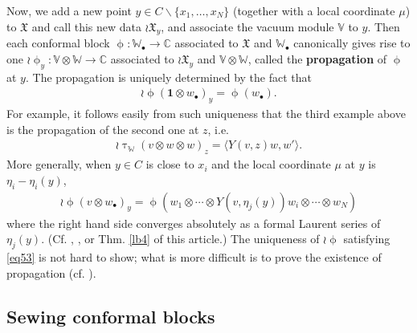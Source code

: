 \documentclass[12pt,a4paper,notitlepage]{article}
\theoremstyle{definition}
\theoremstyle{plain}
\newcommand{\fk}{\mathfrak}
\newcommand{\id}{\mathbf{1}}
\newcommand{\bk}[1]{\langle {#1}\rangle}
\newcommand{\blt}{\bullet}
\newcommand{\Vbb}{\mathbb V}
\newcommand{\Wbb}{\mathbb W}
\newcommand{\Cbb}{\mathbb C}
\numberwithin{equation}{section}
\begin{document}
Now, we add a new point $y\in C\backslash\{x_1,\dots,x_N\}$ (together with a local coordinate $\mu$) to $\fk X$ and call this new data $\wr\fk X_y$, and associate the vacuum module $\Vbb$ to $y$. Then  each conformal block $\upphi:\Wbb_\blt\rightarrow\Cbb$ associated to $\fk X$ and $\Wbb_\blt$ canonically gives rise to one $\wr\upphi_y:\Vbb\otimes\Wbb\rightarrow\Cbb$ associated to $\wr\fk X_y$ and $\Vbb\otimes\Wbb$, called the \textbf{propagation} of $\upphi$ at $y$. The propagation is uniquely determined by the fact that
\begin{align}
\wr\upphi(\id\otimes w_\blt)_y=\upphi(w_\blt).\label{eq53}
\end{align}
For example, it follows easily from such uniqueness that the third example above is the propagation of the second one at $z$, i.e.
\begin{align*}
\wr\uptau_\Wbb(v\otimes w\otimes w)_z=	\bk{Y(v,z)w,w'}.
\end{align*} 
More generally, when $y\in C$ is close to $x_i$ and the local coordinate $\mu$ at $y$ is $\eta_i-\eta_i(y)$, 
\begin{align}
\wr\upphi(v\otimes w_\blt)_y=\upphi(w_1\otimes\cdots\otimes Y(v,\eta_j(y))w_i\otimes\cdots\otimes w_N)	\label{eq54}
\end{align}
where the right hand side converges absolutely as a formal Laurent series of $\eta_j(y)$. (Cf. \cite[Thm. 6.2]{Zhu94}, \cite[Chapter 10]{FB04}, or Thm. \ref{lb4} of this article.) The uniqueness of $\wr\upphi$ satisfying \eqref{eq53} is not hard to show; what is more difficult is to prove the existence of propagation (cf. \cite{TUY89,Zhu94,Zhu96,FB04,Cod19,DGT19a}).



\subsection*{Sewing conformal blocks}
\end{document}
